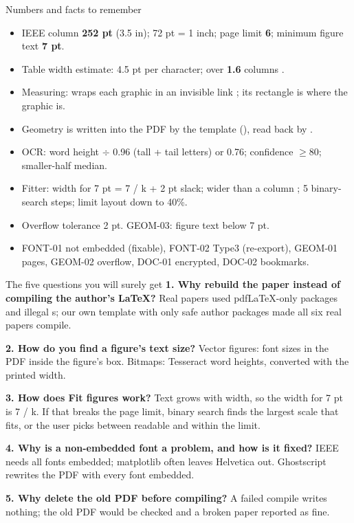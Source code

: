 \begin{cheat}{Numbers and facts to remember}
\begin{itemize}
\item IEEE column \textbf{252 pt} (3.5 in); 72 pt = 1 inch; page limit \textbf{6}; minimum figure text \textbf{7 pt}.
\item Table width estimate: 4.5 pt per character; over \textbf{1.6} columns \textrightarrow{} .
\item Measuring:  wraps each graphic in an invisible link ; its rectangle is where the graphic is.
\item Geometry is written into the PDF by the template (), read back by .
\item OCR: word height \(\div\) 0.96 (tall + tail letters) or 0.76; confidence \(\geq 80\); smaller-half median.
\item Fitter: width for 7 pt = 7 / k + 2 pt slack; wider than a column \textrightarrow{} ; 5 binary-search steps; limit layout down to 40\%.
\item Overflow tolerance 2 pt. GEOM-03: figure text below 7 pt.
\item FONT-01 not embedded (fixable), FONT-02 Type3 (re-export), GEOM-01 pages, GEOM-02 overflow, DOC-01 encrypted, DOC-02 bookmarks.
\end{itemize}
\end{cheat}

\begin{cheat}{The five questions you will surely get}
\textbf{1. Why rebuild the paper instead of compiling the author's LaTeX?} Real papers used pdfLaTeX-only packages and illegal s; our own template with only safe author packages made all six real papers compile.\par
\textbf{2. How do you find a figure's text size?} Vector figures: font sizes in the PDF inside the figure's box. Bitmaps: Tesseract word heights, converted with the printed width.\par
\textbf{3. How does Fit figures work?} Text grows with width, so the width for 7 pt is 7 / k. If that breaks the page limit, binary search finds the largest scale that fits, or the user picks between readable and within the limit.\par
\textbf{4. Why is a non-embedded font a problem, and how is it fixed?} IEEE needs all fonts embedded; matplotlib often leaves Helvetica out. Ghostscript rewrites the PDF with every font embedded.\par
\textbf{5. Why delete the old PDF before compiling?} A failed compile writes nothing; the old PDF would be checked and a broken paper reported as fine.
\end{cheat}
